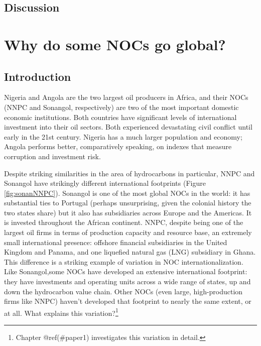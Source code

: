\documentclass[11pt,]{book}
\begin{document}
\hypertarget{conclusion01}{%
\section{Discussion}\label{conclusion01}}

\hypertarget{paper2}{%
\chapter{Why do some NOCs go global?}\label{paper2}}

\hypertarget{intro02}{%
\section{Introduction}\label{intro02}}

Nigeria and Angola are the two largest oil producers in Africa, and their NOCs (NNPC and Sonangol, respectively) are two of the most important domestic economic institutions. Both countries have significant levels of international investment into their oil sectors. Both experienced devastating civil conflict until early in the 21st century. Nigeria has a much larger population and economy; Angola performs better, comparatively speaking, on indexes that measure corruption and investment risk.

Despite striking similarities in the area of hydrocarbons in particular, NNPC and Sonangol have strikingly different international footprints (Figure \ref{fig:sonanNNPC}). Sonangol is one of the most global NOCs in the world: it has substantial ties to Portugal (perhaps unsurprising, given the colonial history the two states share) but it also has subsidiaries across Europe and the Americas. It is invested throughout the African continent. NNPC, despite being one of the largest oil firms in terms of production capacity and resource base, an extremely small international presence: offshore financial subsidiaries in the United Kingdom and Panama, and one liquefied natural gas (LNG) subsidiary in Ghana. This difference is a striking example of variation in NOC internationalization. Like Sonangol,some NOCs have developed an extensive international footprint: they have investments and operating units across a wide range of states, up and down the hydrocarbon value chain. Other NOCs (even large, high-production firms like NNPC) haven't developed that footprint to nearly the same extent, or at all. What explains this variation?\footnote{Chapter @ref(\#paper1) investigates this variation in detail.}
\end{document}
